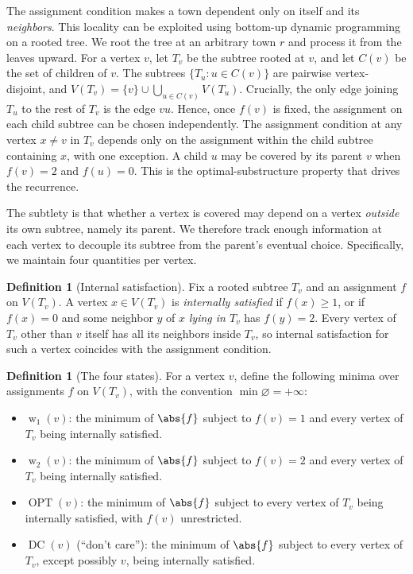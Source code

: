 \documentclass[11pt, a4paper]{article}
\newcommand{\OPT}{\operatorname{OPT}}
\newcommand{\DC}{\operatorname{DC}}
\newcommand{\with}[1]{\operatorname{w}_{#1}}  %
\newcommand{\Tv}{T_{v}}
\theoremstyle{plain}
\theoremstyle{definition}
\newtheorem{definition}[theorem]{Definition}
\begin{document}
The assignment condition makes a town dependent only on itself and its
\emph{neighbors}. This locality can be exploited using bottom-up dynamic
programming on a rooted tree. We root the tree at an arbitrary town $r$ and
process it from the leaves upward. For a vertex $v$, let $\Tv$ be the subtree
rooted at $v$, and let $C(v)$ be the set of children of $v$. The subtrees
$\{T_u : u \in C(v)\}$ are pairwise vertex-disjoint, and
$V(\Tv) = \{v\} \cup \bigcup_{u \in C(v)} V(T_u)$. Crucially, the only edge
joining $T_u$ to the rest of $\Tv$ is the edge $vu$. Hence, once $f(v)$ is fixed,
the assignment on each child subtree can be chosen independently. The assignment
condition at any vertex $x \neq v$ in $\Tv$ depends only on the assignment within
the child subtree containing $x$, with one exception. A child $u$ may be covered
by its parent $v$ when $f(v) = 2$ and $f(u) = 0$. This is the optimal-substructure
property that drives the recurrence.

The subtlety is that whether a vertex is covered may depend on a vertex
\emph{outside} its own subtree, namely its parent. We therefore track enough
information at each vertex to decouple its subtree from the parent's eventual
choice. Specifically, we maintain four quantities per vertex.

\begin{definition}[Internal satisfaction]
Fix a rooted subtree $\Tv$ and an assignment $f$ on $V(\Tv)$. A vertex
$x \in V(\Tv)$ is \emph{internally satisfied} if $f(x) \geq 1$, or if $f(x) = 0$
and some neighbor $y$ of $x$ \emph{lying in $\Tv$} has $f(y) = 2$. Every vertex of
$\Tv$ other than $v$ itself has all its neighbors inside $\Tv$, so internal
satisfaction for such a vertex coincides with the assignment condition.
\end{definition}

\begin{definition}[The four states]\label{def:states}
For a vertex $v$, define the following minima over assignments $f$ on $V(\Tv)$,
with the convention $\min\varnothing = +\infty$:
\begin{itemize}
    \item $\with{1}(v)$: the minimum of $\abs{f}$ subject to $f(v) = 1$ and every
    vertex of $\Tv$ being internally satisfied.
    \item $\with{2}(v)$: the minimum of $\abs{f}$ subject to $f(v) = 2$ and every
    vertex of $\Tv$ being internally satisfied.
    \item $\OPT(v)$: the minimum of $\abs{f}$ subject to every vertex of $\Tv$
    being internally satisfied, with $f(v)$ unrestricted.
    \item $\DC(v)$ (``don't care''): the minimum of $\abs{f}$ subject to every
    vertex of $\Tv$, except possibly $v$, being internally satisfied.
\end{itemize}
\end{definition}
\end{document}
